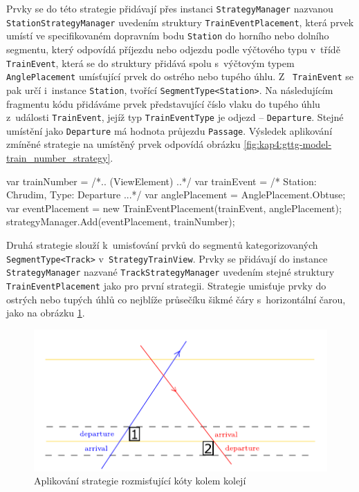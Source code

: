 Prvky se do této strategie přidávají přes instanci \texttt{StrategyManager} nazvanou \texttt{StationStrategyManager} uvedením struktury \texttt{TrainEventPlacement}, která prvek umístí ve specifikovaném dopravním bodu \texttt{Station} do horního nebo dolního segmentu, který odpovídá příjezdu nebo odjezdu podle výčtového typu v~třídě \texttt{TrainEvent}, která se do struktury přidává spolu s~výčtovým typem \texttt{AnglePlacement} umísťující prvek do ostrého nebo tupého úhlu. Z~ \texttt{TrainEvent} se pak určí i~instance \texttt{Station}, tvořící \texttt{SegmentType<Station>}. Na následujícím fragmentu kódu přidáváme prvek představující číslo vlaku do tupého úhlu z~události \texttt{TrainEvent}, jejíž typ \texttt{TrainEventType} je odjezd -- \texttt{Departure}. Stejné umístění jako \texttt{Departure} má hodnota průjezdu \texttt{Passage}. Výsledek aplikování zmíněné strategie na umístěný prvek odpovídá obrázku \ref{fig:kap4:gttg-model-train_number_strategy}.

\begin{csharpcode}
var trainNumber = /*.. (ViewElement) ..*/
var trainEvent = /* Station: Chrudim, Type: Departure ...*/
var anglePlacement = AnglePlacement.Obtuse;
var eventPlacement = new TrainEventPlacement(trainEvent, anglePlacement);
strategyManager.Add(eventPlacement, trainNumber);
\end{csharpcode}

Druhá strategie slouží k~umisťování prvků do segmentů kategorizovaných \texttt{SegmentType<Track>} v~\texttt{StrategyTrainView}. Prvky se přidávají do instance \linebreak\texttt{StrategyManager} nazvané \texttt{TrackStrategyManager} uvedením stejné struktury \texttt{TrainEventPlacement} jako pro první strategii. Strategie umisťuje prvky do ostrých nebo tupých úhlů co nejblíže průsečíku šikmé čáry s~horizontální čarou, jako na obrázku \ref{fig:kap4:gttg-model-time_component_strategy}.


\begin{figure}[!hbt]
	\includegraphics[width=\textwidth]{../img/kap4_segments_track_departure_arrival}
	\caption{Aplikování strategie rozmisťující kóty kolem kolejí}
	\label{fig:kap4:gttg-model-time_component_strategy}
\end{figure}

